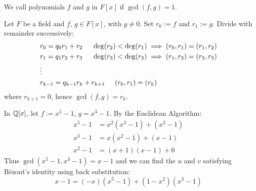 \begin{defbox}
    We call polynomials $f$ and $g$ in $F[x]$  if $\gcd(f,g) = 1$. 
\end{defbox}

\begin{thmbox}
    Let $F$ be a field and $f$, $g \in F[x]$, with $g \neq 0$. Set $r_0 := f$ and $r_1 := g$. Divide with remainder successively:
    \begin{align*}
        &r_0 = q_0r_1 + r_2 \hspace{0.5cm} \deg(r_2) < \deg(r_1) \implies (r_0, r_1) = (r_1, r_2) \\
        &r_1 = q_1r_2 + r_3 \hspace{0.5cm} \deg(r_3) < \deg(r_2) \implies (r_1, r_2) = (r_2, r_3) \\
        &\vdots \\
        &r_{k-1} = q_{k-1}r_{k} + r_{k+1} \hspace{0.5cm} (r_0, r_1) = (r_k)
    \end{align*}
    where $r_{k+1} = 0$, hence $\gcd(f,g) = r_k$.
\end{thmbox}

\begin{example}
    In $\mathbb{Q}[x]$, let $f := x^5 - 1$, $g = x^3 - 1$. By the Euclidean Algorithm:
    \begin{align*}
        x^5 - 1 &= x^2(x^3 - 1) + (x^2 - 1) \\
        x^3 - 1 &= x(x^2 - 1) + (x - 1) \\
        x^2 - 1 &= (x+1)(x-1) + 0 
    \end{align*}
    Thus $\gcd(x^5 - 1, x^3 - 1) = x - 1$ and we can find the $u$ and $v$ satisfying Bézout's identity using back substitution:
    \[ x - 1 = (-x)(x^5 - 1) + (1 - x^2)(x^3 - 1) \]
\end{example}